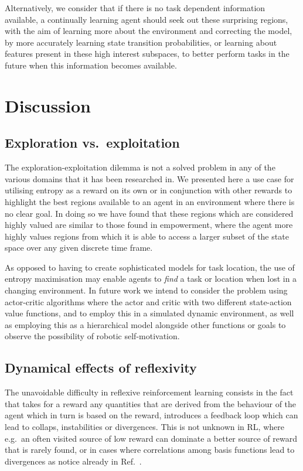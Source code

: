 \documentclass{article}
\begin{document}
Alternatively, we consider that if there is no task dependent information available, a continually learning agent should seek out these surprising regions, with the aim of learning more about the environment and correcting the model, by more accurately learning state transition probabilities, or learning about features present in these high interest subspaces, to better perform tasks in the future when this information becomes available.


\section{Discussion\label{Discussion}}

\subsection{Exploration vs.~exploitation}

The exploration-exploitation dilemma is not a solved problem in any of the various domains that it has been researched in. We presented here a use case for utilising entropy as a reward on its own or in conjunction with other rewards to highlight the best regions available to an agent in an environment where there is no clear goal. In doing so we have found that these regions which are considered highly valued are similar to those found in empowerment, where the agent more highly values regions from which it is able to access a larger subset of the state space over any given discrete time frame.

As opposed to having to create sophisticated models for task location, the use of entropy maximisation may enable agents to \emph{find} a task or location when lost in a changing environment. In future work we intend to consider the problem using actor-critic algorithms where the actor and critic with two different state-action value functions, and to employ this in a simulated dynamic environment, as well as employing this as a hierarchical model alongside other functions or goals to observe the possibility of robotic self-motivation.

\subsection{Dynamical effects of reflexivity}

The unavoidable difficulty in reflexive reinforcement learning consists in the 
fact that takes for a reward any quantities that are derived from the behaviour of the agent
which in turn is based on the reward,
introduces a feedback loop which can lead to collaps, instabilities or divergences. 
This is not unknown in RL, where e.g.~an often visited source of low reward can dominate a better source of reward that is rarely found, or in cases where correlations among basis functions lead to divergences as notice already in Ref.~\citep{baird1995residual}. 
\end{document}
